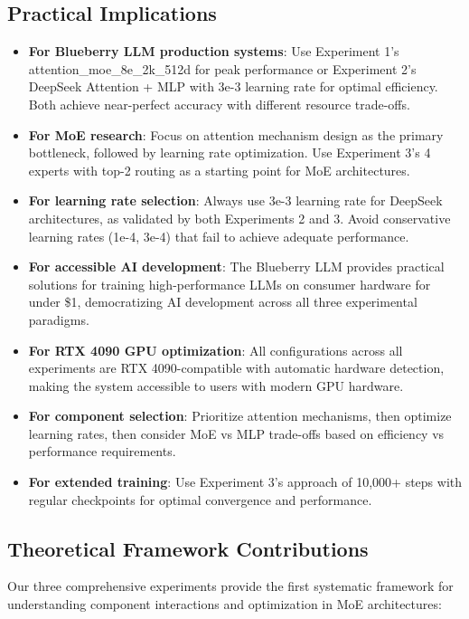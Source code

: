 \documentclass[11pt,a4paper]{article}
\begin{document}
\subsection{Practical Implications}

\begin{itemize}
    \item \textbf{For Blueberry LLM production systems}: Use Experiment 1's attention\_moe\_8e\_2k\_512d for peak performance or Experiment 2's DeepSeek Attention + MLP with 3e-3 learning rate for optimal efficiency. Both achieve near-perfect accuracy with different resource trade-offs.
    \item \textbf{For MoE research}: Focus on attention mechanism design as the primary bottleneck, followed by learning rate optimization. Use Experiment 3's 4 experts with top-2 routing as a starting point for MoE architectures.
    \item \textbf{For learning rate selection}: Always use 3e-3 learning rate for DeepSeek architectures, as validated by both Experiments 2 and 3. Avoid conservative learning rates (1e-4, 3e-4) that fail to achieve adequate performance.
    \item \textbf{For accessible AI development}: The Blueberry LLM provides practical solutions for training high-performance LLMs on consumer hardware for under \$1, democratizing AI development across all three experimental paradigms.
    \item \textbf{For RTX 4090 GPU optimization}: All configurations across all experiments are RTX 4090-compatible with automatic hardware detection, making the system accessible to users with modern GPU hardware.
    \item \textbf{For component selection}: Prioritize attention mechanisms, then optimize learning rates, then consider MoE vs MLP trade-offs based on efficiency vs performance requirements.
    \item \textbf{For extended training}: Use Experiment 3's approach of 10,000+ steps with regular checkpoints for optimal convergence and performance.
\end{itemize}

\subsection{Theoretical Framework Contributions}

Our three comprehensive experiments provide the first systematic framework for understanding component interactions and optimization in MoE architectures:
\end{document}
